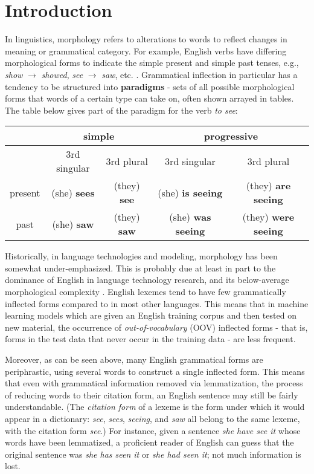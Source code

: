 \chapter{Introduction}
\label{introduction}

In linguistics, morphology refers to alterations to words to reflect changes in meaning or grammatical category. For example, English verbs have differing morphological forms to indicate the simple present and simple past tenses, e.g., \textit{show} $\rightarrow$ \textit{showed}, \textit{see} $\rightarrow$ \textit{saw}, etc. \parencite{Dreyer2008}. Grammatical inflection in particular has a tendency to be structured into \textbf{paradigms} - sets of all possible morphological forms that words of a certain type can take on, often shown arrayed in tables. The table below gives part of the paradigm for the verb \textit{to see}:

\begin{tabular}{|c||c|c|c|c|}
\hline
& \multicolumn{2}{c|}{simple} & \multicolumn{2}{c|}{progressive} \\
\hline
& 3rd singular & 3rd plural & 3rd singular & 3rd plural \\
\hline \hline
present & (she) \textbf{sees} & (they) \textbf{see} & (she) \textbf{is seeing} & (they) \textbf{are seeing} \\
\hline 
past & (she) \textbf{saw} & (they) \textbf{saw} & (she) \textbf{was seeing} & (they) \textbf{were seeing} \\
\hline
\end{tabular}

Historically, in language technologies and modeling, morphology has been somewhat under-emphasized. This is probably due at least in part to the dominance of English in language technology research, and its below-average morphological complexity \parencite{Cotterell2017a}. English lexemes tend to have few grammatically inflected forms compared to in most other languages. This means that in machine learning models which are given an English training corpus and then tested on new material, the occurrence of \textit{out-of-vocabulary} (OOV) inflected forms - that is, forms in the test data that never occur in the training data - are less frequent. 

Moreover, as can be seen above, many English grammatical forms are periphrastic, using several words to construct a single inflected form. This means that even with grammatical information removed via lemmatization, the process of reducing words to their citation form, an English sentence may still be fairly understandable. (The \textit{citation form} of a lexeme is the form under which it would appear in a dictionary: \textit{see}, \textit{sees}, \textit{seeing}, and \textit{saw} all belong to the same lexeme, with the citation form \textit{see}.) For instance, given a sentence \textit{she have see it} whose words have been lemmatized, a proficient reader of English can guess that the original sentence was \textit{she has seen it} or \textit{she had seen it}; not much information is lost.

